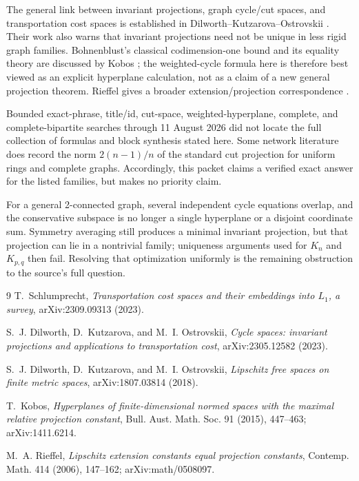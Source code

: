 \documentclass[11pt]{article}
\begin{document}
The general link between invariant projections, graph cycle/cut spaces,
and transportation cost spaces is established in
Dilworth--Kutzarova--Ostrovskii \cite{DKO2023,DKO2018}.  Their work also
warns that invariant projections need not be unique in less rigid graph
families.  Bohnenblust's classical codimension-one bound and its equality
theory are discussed by Kobos \cite{Kobos}; the weighted-cycle formula here
is therefore best viewed as an explicit hyperplane calculation, not as a
claim of a new general projection theorem.  Rieffel gives a broader
extension/projection correspondence \cite{Rieffel}.

Bounded exact-phrase, title/id, cut-space, weighted-hyperplane, complete,
and complete-bipartite searches through 11 August 2026 did not locate the
full collection of formulas and block synthesis stated here.  Some network
literature does record the norm \(2(n-1)/n\) of the standard cut projection
for uniform rings and complete graphs.  Accordingly, this packet claims a
verified exact answer for the listed families, but makes no priority claim.

For a general 2-connected graph, several independent cycle equations
overlap, and the conservative subspace is no longer a single hyperplane or
a disjoint coordinate sum.  Symmetry averaging still produces a minimal
invariant projection, but that projection can lie in a nontrivial family;
uniqueness arguments used for \(K_n\) and \(K_{p,q}\) then fail.  Resolving
that optimization uniformly is the remaining obstruction to the source's
full question.

\begin{thebibliography}{9}
T.~Schlumprecht,
\emph{Transportation cost spaces and their embeddings into $L_1$, a survey},
arXiv:2309.09313 (2023).

S.~J. Dilworth, D.~Kutzarova, and M.~I. Ostrovskii,
\emph{Cycle spaces: invariant projections and applications to transportation cost},
arXiv:2305.12582 (2023).

S.~J. Dilworth, D.~Kutzarova, and M.~I. Ostrovskii,
\emph{Lipschitz free spaces on finite metric spaces},
arXiv:1807.03814 (2018).

T.~Kobos,
\emph{Hyperplanes of finite-dimensional normed spaces with the maximal relative projection constant},
Bull. Aust. Math. Soc. 91 (2015), 447--463; arXiv:1411.6214.

M.~A. Rieffel,
\emph{Lipschitz extension constants equal projection constants},
Contemp. Math. 414 (2006), 147--162; arXiv:math/0508097.
\end{thebibliography}
\end{document}
